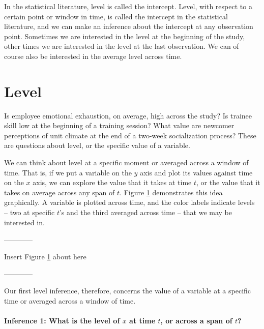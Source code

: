 \documentclass[english,,man]{apa6}
\let\oldparagraph\paragraph
\renewcommand{\paragraph}[1]{\oldparagraph{#1}\mbox{}}
\theoremstyle{definition}
\theoremstyle{definition}
\theoremstyle{definition}
\theoremstyle{remark}
\begin{document}
In the statistical literature, level is called the intercept. Level,
with respect to a certain point or window in time, is called the
intercept in the statistical literature, and we can make an inference
about the intercept at any observation point. Sometimes we are
interested in the level at the beginning of the study, other times we
are interested in the level at the last observation. We can of course
also be interested in the average level across time.

\hypertarget{level}{%
\section{Level}\label{level}}

Is employee emotional exhaustion, on average, high across the study? Is
trainee skill low at the beginning of a training session? What value are
newcomer perceptions of unit climate at the end of a two-week
socialization process? These are questions about level, or the specific
value of a variable.

We can think about level at a specific moment or averaged across a
window of time. That is, if we put a variable on the \(y\) axis and plot
its values against time on the \(x\) axis, we can explore the value that
it takes at time \(t\), or the value that it takes on average across any
span of \(t\). Figure \ref{level} demonstrates this idea graphically. A
variable is plotted across time, and the color labels indicate levels --
two at specific \(t\)'s and the third averaged across time -- that we
may be interested in.

\begin{center}

------------

Insert Figure \ref{level} about here

------------

\end{center}

\noindent Our first level inference, therefore, concerns the value of a
variable at a specific time or averaged across a window of time.

\hypertarget{inference-1-what-is-the-level-of-x-at-time-t-or-across-a-span-of-t}{%
\paragraph{\texorpdfstring{Inference 1: What is the level of \(x\) at
time \(t\), or across a span of
\(t\)?}{Inference 1: What is the level of x at time t, or across a span of t?}}\label{inference-1-what-is-the-level-of-x-at-time-t-or-across-a-span-of-t}}
\end{document}
